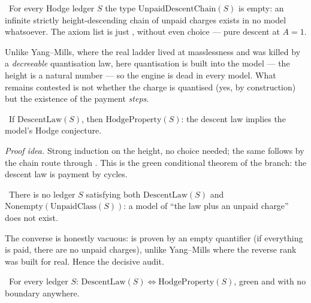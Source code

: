\begin{theorem}\label{thm:isEmpty_unpaidDescentChain}
\green{}\ For every Hodge ledger $S$ the type $\mathrm{UnpaidDescentChain}(S)$ is empty: an infinite
strictly height-descending chain of unpaid charges exists in no model whatsoever. The axiom list is
just , without even choice --- pure descent at $A=1$.
\end{theorem}

Unlike Yang--Mills, where the real ladder lived at masslessness and was killed by a
\emph{decreeable} quantisation law, here quantisation is built into the model --- the height is a
natural number --- so the engine is dead in every model. What remains contested is not whether the
charge is quantised (yes, by construction) but the existence of the payment \emph{steps}.

\begin{theorem}\label{thm:hodgeProperty_of_descentLaw}
\green{}\ If $\mathrm{DescentLaw}(S)$, then $\mathrm{HodgeProperty}(S)$: the descent law implies the
model's Hodge conjecture.
\end{theorem}

\emph{Proof idea.} Strong induction on the height, no choice needed; the same follows by the chain
route through . This is the green conditional theorem of the branch: the descent
law is payment by cycles.

\begin{theorem}\label{thm:no_unpaid_lawful_model}
\green{}\ There is no ledger $S$ satisfying both $\mathrm{DescentLaw}(S)$ and
$\mathrm{Nonempty}(\mathrm{UnpaidClass}(S))$: a model of ``the law plus an unpaid charge'' does not
exist.
\end{theorem}

The converse is honestly vacuous:  is proven by an empty
quantifier (if everything is paid, there are no unpaid charges), unlike Yang--Mills where the reverse
rank was built for real. Hence the decisive audit.

\begin{theorem}\label{thm:descentLaw_iff_hodgeProperty}
\green{}\ For every ledger $S$: $\mathrm{DescentLaw}(S)\iff\mathrm{HodgeProperty}(S)$, green and with
no boundary anywhere.
\end{theorem}

